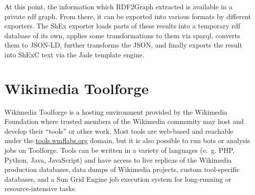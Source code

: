 At this point, the information which RDF2Graph extracted is available in a private \gls{rdf} graph.
From there, it can be exported into various formats by different exporters.
The ShEx exporter loads parts of these results into a temporary \gls{rdf} database of its own,
applies some transformations to them via \gls{sparql},
converts them to JSON-LD,
further transforms the JSON,
and finally exports the result into ShExC text via the Jade template engine.

\section{Wikimedia Toolforge}
\label{ch:Background:Toolforge}


Wikimedia Toolforge is a hosting environment provided by the Wikimedia Foundation
where trusted members of the Wikimedia community may host and develop their “tools” or other work.
Most tools are web-based and reachable under the \href{https://tools.wmflabs.org/}{tools.wmflabs.org} domain,
but it is also possible to run bots or analysis jobs on Toolforge.
Tools can be written in a variety of languages
(e.~g. PHP, Python, Java, JavaScript)
and have access to live replicas of the Wikimedia production databases,
data dumps of Wikimedia projects,
custom tool-specific databases,
and a Sun Grid Engine job execution system for long-running or resource-intensive tasks.

